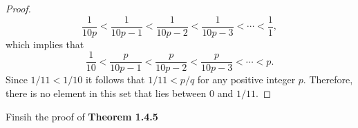 \documentclass[12pt]{article}
\newenvironment{problem}[2][Problem]{\begin{trivlist}
		\item[\hskip \labelsep {\bfseries #1}\hskip \labelsep {\bfseries #2.}]}{\end{trivlist}}
\begin{document}
\begin{problem}{1.4.6}
\begin{enumerate}[label=(\alph*)]
\begin{proof}
				\begin{equation*}
					\frac{1}{10p} <  \frac{1}{10p-1} < \frac{1}{10p-2} < \frac{1}{10p-3} < \cdots < \frac{1}{1},
				\end{equation*}
			which implies that
			\begin{equation*}
				 \frac{1}{10} < \frac{p}{10p-1} < \frac{p}{10p-2} < \frac{p}{10p-3} < \cdots < p.
			\end{equation*}
			Since $1/11 < 1/10$ it follows that $1/11 < p/q$ for any positive integer $p$. Therefore, there is no element in this set that lies between 0 and $1/11$.
			\end{proof}
 		\end{enumerate}
	\end{problem}

	\begin{problem}{1.4.7}
		Finsih the proof of \textbf{Theorem 1.4.5} 
	\end{problem}
\end{document}

